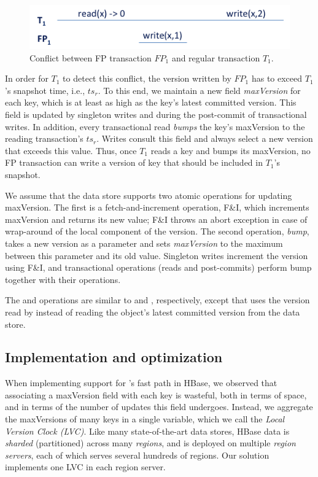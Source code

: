 \begin{figure}[htb]
\includegraphics[width=\columnwidth]{figs/FP-why-bump}
\caption{Conflict between FP transaction $FP_1$ and regular transaction $T_1$.}
\label{fig:why-bump}
\end{figure}

In order for $T_1$ to detect this 
conflict, the version written by $FP_1$ has to exceed $T_1$'s snapshot time, i.e., $ts_r$.
To this end, we maintain a new field \emph{maxVersion} for each key, which is at least as 
high as the key's latest committed version. 
This field is updated by singleton writes and during the post-commit of transactional writes.
In addition, every transactional read \emph{bumps} the key's {maxVersion}
to the reading transaction's $ts_r$. 
Writes consult this field and always select a new version that exceeds this value.
Thus, once $T_1$ reads a key and bumps its {maxVersion}, 
no FP transaction can write a version of key that should be 
included in $T_1$'s snapshot.

We assume that the data store supports two atomic operations for updating {maxVersion}.
The first is a fetch-and-increment operation, F\&I, which increments {maxVersion} and returns its
new value; F\&I throws an abort exception in case of wrap-around of the local component of 
the version. The second operation, \emph{bump}, takes a new version  as a parameter and
sets  \emph{maxVersion} to the maximum between this parameter and its old value.
Singleton writes  increment the version using F\&I, and transactional operations (reads and post-commits)
perform { bump} together with their operations. 

The   and  operations are similar to  and , 
respectively, except that  uses the version read by  instead of 
reading the object's latest committed version from the data store.

\subsection{Implementation and optimization}
\label{ssec:fast-impl}

When implementing support for \sys's fast path in HBase, 
we observed that associating a maxVersion field with each key is wasteful,
both in terms of space, and in terms of the number of updates this field undergoes.
Instead, we aggregate the maxVersions of many keys in a single variable, 
which we call the \emph{Local Version Clock (LVC)}.
Like many state-of-the-art data stores, HBase data is \emph{sharded} (partitioned) 
across many \emph{regions}, and is deployed on multiple  \emph{region servers}, each of which serves
several hundreds of regions. Our solution implements one LVC in each region server. 

